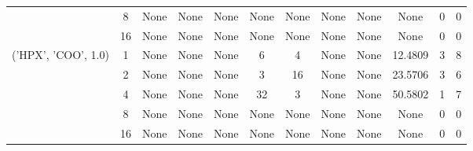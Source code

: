 \begin{tabular}{cccccccccccc}
& 8& None& None& None& None& None& None& None& None& 0& 0\\
& 16& None& None& None& None& None& None& None& None& 0& 0\\
\hline
\multirow{5}{*}{('HPX', 'COO', 1.0)}& 1& None& None& None& 6& 4& None& None& 12.4809& 3& 8\\
& 2& None& None& None& 3& 16& None& None& 23.5706& 3& 6\\
& 4& None& None& None& 32& 3& None& None& 50.5802& 1& 7\\
& 8& None& None& None& None& None& None& None& None& 0& 0\\
& 16& None& None& None& None& None& None& None& None& 0& 0\\
\hline
\end{tabular}
